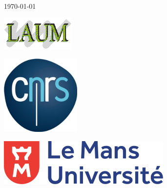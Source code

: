 \documentclass[12pt]{report}
\begin{document}
\begin{titlepage}


{\large \today}\\[1cm] %

\hspace{2cm}
\begin{minipage}[c]{0.4\linewidth}
\centering
\hspace{-3cm}
\vspace{1.2cm}
\includegraphics[scale=0.9]{logo_LAUM.png}\\[1cm]  
\end{minipage}
\begin{minipage}[c]{0.4\linewidth}
\centering
\hspace{-1cm}
\vspace{1.2cm}
\includegraphics[scale=1.6]{logo_cnrs.jpg}\\[1cm]  
\end{minipage}
\begin{minipage}[l]{0.8\linewidth}
\centering
\hspace{1.3cm}
\vspace{0.5cm}
\includegraphics[scale=0.5]{Logo_LeMansUniv.png}\\[1cm]  
\end{minipage}
\end{titlepage}
\begin{abstract}

\end{abstract}
\tableofcontents
\listoffigures
\end{document}
